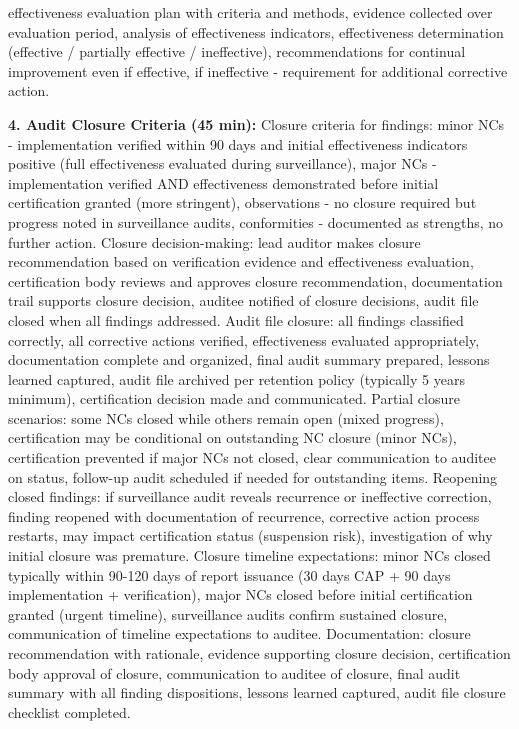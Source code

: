 \documentclass[11pt,a4paper]{article}
\begin{document}
effectiveness evaluation plan with criteria and methods, evidence collected over evaluation period, analysis of effectiveness indicators, effectiveness determination (effective / partially effective / ineffective), recommendations for continual improvement even if effective, if ineffective - requirement for additional corrective action.

\textbf{4. Audit Closure Criteria (45 min):} Closure criteria for findings: minor NCs - implementation verified within 90 days and initial effectiveness indicators positive (full effectiveness evaluated during surveillance), major NCs - implementation verified AND effectiveness demonstrated before initial certification granted (more stringent), observations - no closure required but progress noted in surveillance audits, conformities - documented as strengths, no further action. Closure decision-making: lead auditor makes closure recommendation based on verification evidence and effectiveness evaluation, certification body reviews and approves closure recommendation, documentation trail supports closure decision, auditee notified of closure decisions, audit file closed when all findings addressed. Audit file closure: all findings classified correctly, all corrective actions verified, effectiveness evaluated appropriately, documentation complete and organized, final audit summary prepared, lessons learned captured, audit file archived per retention policy (typically 5 years minimum), certification decision made and communicated. Partial closure scenarios: some NCs closed while others remain open (mixed progress), certification may be conditional on outstanding NC closure (minor NCs), certification prevented if major NCs not closed, clear communication to auditee on status, follow-up audit scheduled if needed for outstanding items. Reopening closed findings: if surveillance audit reveals recurrence or ineffective correction, finding reopened with documentation of recurrence, corrective action process restarts, may impact certification status (suspension risk), investigation of why initial closure was premature. Closure timeline expectations: minor NCs closed typically within 90-120 days of report issuance (30 days CAP + 90 days implementation + verification), major NCs closed before initial certification granted (urgent timeline), surveillance audits confirm sustained closure, communication of timeline expectations to auditee. Documentation: closure recommendation with rationale, evidence supporting closure decision, certification body approval of closure, communication to auditee of closure, final audit summary with all finding dispositions, lessons learned captured, audit file closure checklist completed.
\end{document}
